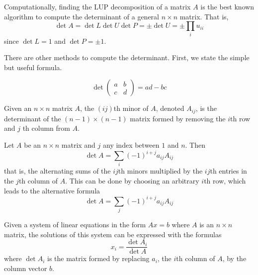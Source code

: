   Computationally, finding the LUP decomposition of a matrix $A$ is the best known algorithm to compute the determinant of a general $n \times n$ matrix. That is, 
  \begin{equation}
    \det{A} = \det{L} \det{U} \det{P} = \pm \det{U} = \pm \prod_i u_{i i}
  \end{equation}
  since $\det{L} = 1$ and $\det{P} = \pm 1$. 

  There are other methods to compute the determinant. First, we state the simple but useful formula.

  \begin{theorem}
    \begin{equation}
      \det{\begin{pmatrix}
      a&b\\c&d 
      \end{pmatrix}} = a d - b c
    \end{equation}
  \end{theorem}

  \begin{definition}
    Given an $n \times n$ matrix $A$, the $(i j)$th minor of $A$, denoted $A_{i j}$, is the determinant of the $(n-1) \times (n-1)$ matrix formed by removing the $i$th row and $j$ th column from $A$. 
  \end{definition}

  \begin{theorem}
    Let $A$ be an $n \times n$ matrix and $j$ any index between $1$ and $n$. Then
    \begin{equation}
      \det{A} = \sum_i (-1)^{i + j} a_{i j} A_{i j}
    \end{equation}
    that is, the alternating sums of the $ij$th minors multiplied by the $ij$th entries in the $j$th column of $A$. This can be done by choosing an arbitrary $i$th row, which leads to the alternative formula 
    \begin{equation}
      \det{A} = \sum_j (-1)^{i + j} a_{i j} A_{i j} 
    \end{equation}
  \end{theorem}

  \begin{theorem}
    Given a system of linear equations in the form $A x = b$ where $A$ is an $n \times n$ matrix, the solutions of this system can be expressed with the formulas 
    \begin{equation}
      x_i = \frac{ \det{A_i}}{\det{A}}
    \end{equation}
    where $\det{A_i}$ is the matrix formed by replacing $a_i$, the $i$th column of $A$, by the column vector $b$. 
  \end{theorem}


